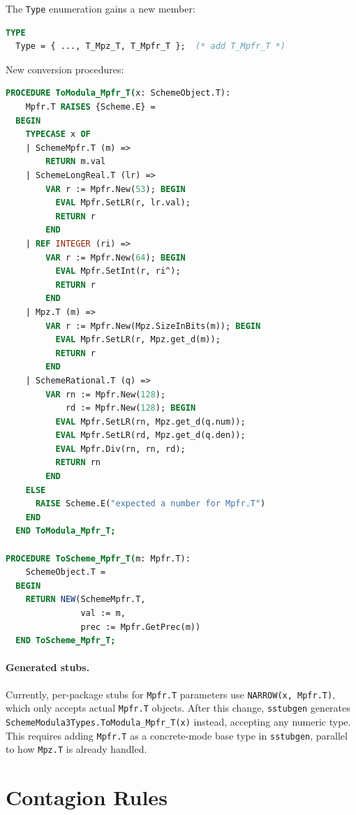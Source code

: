 \documentclass[12pt]{article}
\begin{document}
The {\tt Type} enumeration gains a new member:
\begin{lstlisting}[language=Modula3]
TYPE
  Type = { ..., T_Mpz_T, T_Mpfr_T };  (* add T_Mpfr_T *)
\end{lstlisting}

\noindent New conversion procedures:

\begin{lstlisting}[language=Modula3]
PROCEDURE ToModula_Mpfr_T(x: SchemeObject.T):
    Mpfr.T RAISES {Scheme.E} =
  BEGIN
    TYPECASE x OF
    | SchemeMpfr.T (m) =>
        RETURN m.val
    | SchemeLongReal.T (lr) =>
        VAR r := Mpfr.New(53); BEGIN
          EVAL Mpfr.SetLR(r, lr.val);
          RETURN r
        END
    | REF INTEGER (ri) =>
        VAR r := Mpfr.New(64); BEGIN
          EVAL Mpfr.SetInt(r, ri^);
          RETURN r
        END
    | Mpz.T (m) =>
        VAR r := Mpfr.New(Mpz.SizeInBits(m)); BEGIN
          EVAL Mpfr.SetLR(r, Mpz.get_d(m));
          RETURN r
        END
    | SchemeRational.T (q) =>
        VAR rn := Mpfr.New(128);
            rd := Mpfr.New(128); BEGIN
          EVAL Mpfr.SetLR(rn, Mpz.get_d(q.num));
          EVAL Mpfr.SetLR(rd, Mpz.get_d(q.den));
          EVAL Mpfr.Div(rn, rn, rd);
          RETURN rn
        END
    ELSE
      RAISE Scheme.E("expected a number for Mpfr.T")
    END
  END ToModula_Mpfr_T;

PROCEDURE ToScheme_Mpfr_T(m: Mpfr.T):
    SchemeObject.T =
  BEGIN
    RETURN NEW(SchemeMpfr.T,
               val := m,
               prec := Mpfr.GetPrec(m))
  END ToScheme_Mpfr_T;
\end{lstlisting}

\paragraph{Generated stubs.}
Currently, per-package stubs for {\tt Mpfr.T} parameters use
{\tt NARROW(x, Mpfr.T)}, which only accepts actual {\tt Mpfr.T}
objects.  After this change, {\tt sstubgen} generates
{\tt SchemeModula3Types.ToModula\_Mpfr\_T(x)} instead, accepting
any numeric type.  This requires adding {\tt Mpfr.T} as a
concrete-mode base type in {\tt sstubgen}, parallel to how
{\tt Mpz.T} is already handled.


\section{Contagion Rules}
\label{sec:contagion}
\end{document}
